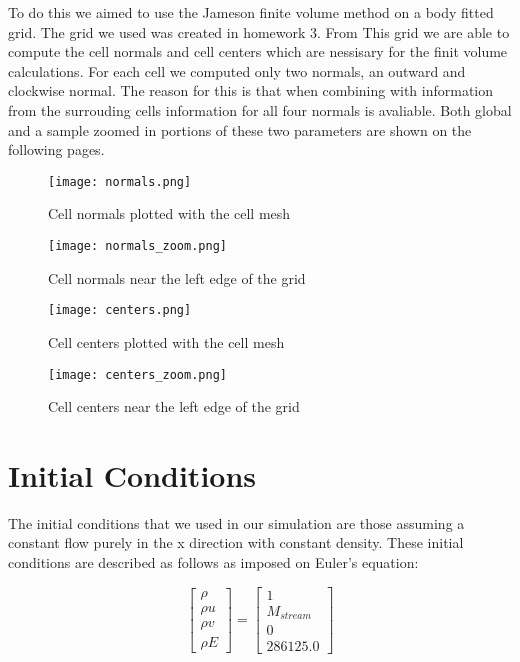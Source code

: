 \documentclass[a4paper,12pt,titlepage]{article}
\newcommand{\scale}{0.5}
\begin{document}
  To do this we aimed to use the Jameson finite volume method on a body fitted grid.  The grid we used was created in homework 3.  From This grid we are able to compute the cell normals and cell centers which are nessisary for the finit volume calculations.  For each cell we computed only two normals, an outward and clockwise normal.  The reason for this is that when combining with information from the surrouding cells information for all four normals is avaliable.  Both global and a sample zoomed in portions of these two parameters are shown on the following pages.
\begin{figure}[H]
  \begin{center}
    \texttt{[image: normals.png]}
    \caption{Cell normals plotted with the cell mesh}
  \end{center}
\end{figure}

\begin{figure}[H]
  \begin{center}
    \texttt{[image: normals\_zoom.png]}
    \caption{Cell normals near the left edge of the grid}
  \end{center}
\end{figure}


\begin{figure}[H]
  \begin{center}
    \texttt{[image: centers.png]}
    \caption{Cell centers plotted with the cell mesh}
  \end{center}
\end{figure}

\begin{figure}[H]
  \begin{center}
    \texttt{[image: centers\_zoom.png]}
    \caption{Cell centers near the left edge of the grid}
  \end{center}
\end{figure}


\section{Initial Conditions}
The initial conditions that we used in our simulation are those assuming a constant flow purely in the x direction with constant density.  These initial conditions are described as follows as imposed on Euler's equation:

\begin{equation}
\begin{bmatrix}
\rho \\ \rho u \\ \rho v \\ \rho E
\end{bmatrix}
=
\begin{bmatrix}
1 \\ M_{stream} \\ 0 \\ 286125.0
\end{bmatrix}
\end{equation}
\end{document}
